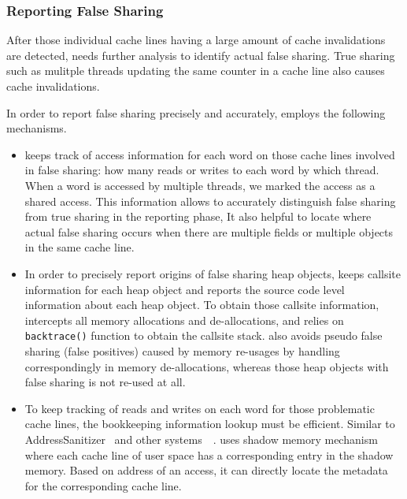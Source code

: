 \subsubsection{Reporting False Sharing}
After those individual cache lines having a large amount of cache
invalidations are detected,
 needs further analysis to identify actual false sharing. 
True sharing such as mulitple threads updating 
the same counter in a cache line also causes cache invalidations.

In order to report false sharing precisely and accurately, 
\Defaults{} employs the following mechanisms. 
\begin{itemize}
\item
{} keeps track of access information for each word on those
cache lines involved in false sharing: how many reads or writes to each word by which thread. 
When a word is accessed by multiple threads,
we marked the access as a shared access. This information 
allows  to accurately distinguish false sharing from true sharing 
in the reporting phase,  
It also helpful to locate where 
actual false sharing occurs when there are multiple fields or multiple objects in the same cache line. 

\item
In order to precisely report origins of false sharing heap objects, 
keeps callsite information for each heap object and reports the source code level
information about each heap object. To obtain those callsite information, 
intercepts all memory allocations and de-allocations, and relies on \texttt{backtrace()} 
function to obtain the callsite stack. 
 also avoids pseudo false sharing (false positives) caused by memory re-usages 
by handling correspondingly in memory de-allocations, whereas those heap objects with false 
sharing is not re-used at all.

\item
To keep tracking of reads and writes on each word for those problematic cache lines,
the bookkeeping information lookup must be efficient.
Similar to 
AddressSanitizer~\cite{Addresssanitizer} and other systems~\cite{qinzhaodetection}~\cite{Valgrind}. 
 uses shadow memory mechanism
where each cache line of user space has a corresponding entry in the shadow memory. 
Based on address of an access, it can directly locate
the metadata for the corresponding cache line.


\end{itemize}
